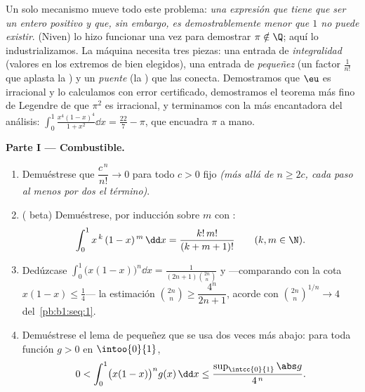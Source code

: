 \begin{problem}
\label{pb:b1:integration:1}
Un solo mecanismo mueve todo este problema: \emph{una expresión que
tiene que ser un entero positivo y que, sin embargo, es
demostrablemente menor que $1$ no puede existir}.
 (Niven) lo hizo funcionar una vez para
demostrar $\pi \notin \Q$; aquí lo industrializamos. La máquina
necesita tres piezas: una entrada de \emph{integralidad} (valores en
los extremos de  bien elegidos), una entrada de
\emph{pequeñez} (un factor $\frac{1}{n!}$ que aplasta la ) y
un \emph{puente} (la ) que las conecta.
Demostramos que $\eu$ es irracional y lo calculamos con error
certificado, demostramos el teorema más fino de Legendre de que
$\pi^2$ es irracional, y terminamos con la  más encantadora
del análisis: $\int_0^1 \frac{x^4(1 - x)^4}{1 + x^2}\dd x =
\frac{22}{7} - \pi$, que encuadra $\pi$ a mano.

\medskip
\noindent\textbf{Parte I --- Combustible.}
\begin{enumerate}
  \item Demuéstrese que $\dfrac{c^{\,n}}{n!} \to 0$ para todo
        $c > 0$ fijo \emph{(más allá de $n \geq 2c$, cada paso al
        menos  por dos el término)}.
  \item ( beta) Demuéstrese, por inducción sobre $m$ con
        :
        \[
        \int_0^1 x^{\,k}\,(1 - x)^{\,m}\,\dd x =
        \frac{k!\,m!}{(k + m + 1)!}
        \qquad (k, m \in \N).
        \]
  \item Dedúzcase $\displaystyle\int_0^1 \bigl(x(1-x)\bigr)^n \dd x
        = \frac{1}{(2n+1)\binom{2n}{n}}$ y ---comparando con la cota
        $x(1 - x) \leq \frac14$--- la estimación
        $\binom{2n}{n} \geq \dfrac{4^n}{2n+1}$, acorde con
        $\binom{2n}{n}^{1/n} \to 4$ del~\cref{pb:b1:seq:1}.
  \item Demuéstrese el lema de pequeñez que se usa dos veces más
        abajo: para toda función  $g > 0$ en $\intoo{0}{1}$,
        \[
        0 < \int_0^1 \bigl(x(1-x)\bigr)^n g(x)\,\dd x
        \leq \frac{\sup_{\intcc{0}{1}}\abs g}{4^{\,n}} .
        \]
\end{enumerate}


\end{problem}
